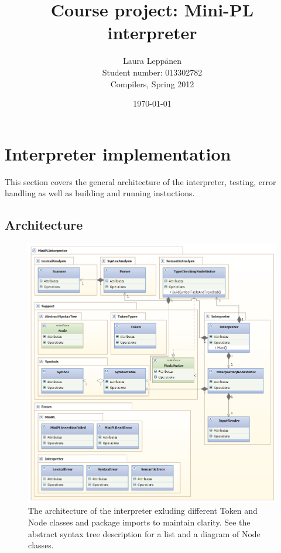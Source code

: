 \documentclass[a4paper,11pt]{article}
\begin{document}
\title{Course project: Mini-PL interpreter}
\author{Laura Leppänen \\ Student number: 013302782 \\ Compilers, Spring 2012}
\date{\today}
\maketitle
\thispagestyle{empty}

\tableofcontents
\onehalfspacing

\newpage
\setcounter{page}{1}

\section{Interpreter implementation}

This section covers the general architecture of the interpreter, testing, error handling as well as building and running instuctions.

\subsection{Architecture}

\begin{figure}
    \includegraphics[scale=0.75]{architecture.png}
    \caption{The architecture of the interpreter exluding different Token and Node classes and package imports to maintain clarity. See the abstract syntax tree description for a list and a diagram of Node classes.}
    \label{fig:architecture}
\end{figure}
\end{document}
